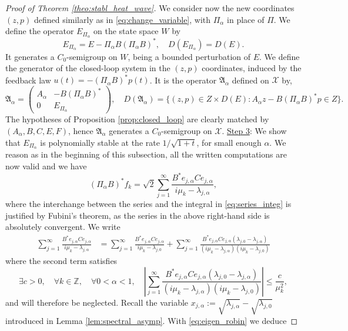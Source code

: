 \documentclass[10pt]{article}
\begin{document}
\begin{proof}[Proof of Theorem \ref{theo:stabl_heat_wave}]
We consider now the new coordinates $(z,p)$ defined similarly as in \eqref{eq:change_variable}, with $\Pi_\alpha$ in place of $\Pi$. We define the operator $E_{\Pi_\alpha}$ on the state space $W$ by 
\[
E_{\Pi_\alpha} = E - \Pi_\alpha B (\Pi_\alpha B)^*,\quad D(E_{\Pi_\alpha}) = D(E).
\]
It generates a $C_0$-semigroup on $W$, being a bounded perturbation of $E$. We define the generator of the closed-loop system in the $(z,p)$ coordinates, induced by the feedback law $u(t) = -(\Pi_\alpha B)^* p(t)$. It is the operator $\mathfrak{A}_\alpha$ defined on $\mathcal{X}$ by, 
\[
\mathfrak{A}_\alpha = \left( \begin{array}{cc}
A_\alpha & -B(\Pi_\alpha B)^* \\
0 & E_{\Pi_\alpha}
\end{array} \right),\quad 
D(\mathfrak{A}_\alpha) = \{ (z,p) \in Z \times D(E) : A_\alpha z - B(\Pi_\alpha B)^*p \in Z\}. 
\]
The hypotheses of Proposition \ref{prop:closed_loop} are clearly matched by $(A_\alpha, B, C, E, F)$, hence $\mathfrak{A}_\alpha$ generates a $C_0$-semigroup on $\mathcal{X}$. 
\newline
\newline
\underline{Step 3}: We show that $E_{\Pi_\alpha}$ is polynomially stable at the rate $1/\sqrt{1+t}$, for small enough $\alpha$.
\newline
\newline
We reason as in the beginning of this subsection, all the written computations are now valid and we have 
 \[
(\Pi_\alpha B)^* f_k = \sqrt{2} \sum_{j=1}^\infty \frac{B^* e_{j,\alpha} C e_{j,\alpha}}{i \mu_k - \lambda_{j,\alpha}},
\]
where the interchange between the series and the integral in \eqref{eq:series_integ} is justified by Fubini's theorem, as the series in the above right-hand side is absolutely convergent. We write
\begin{align*}
\sum_{j=1}^\infty \frac{B^* e_{j,\alpha} C e_{j,\alpha}}{i \mu_k - \lambda_{j,\alpha}} &= \sum_{j=1}^\infty \frac{B^* e_{j,\alpha} C e_{j,\alpha}}{i \mu_k - \lambda_{j,0}} + \sum_{j=1}^\infty \frac{B^* e_{j,\alpha} C e_{j,\alpha} (\lambda_{j,0} - \lambda_{j,\alpha})}{(i \mu_k - \lambda_{j,\alpha})(i \mu_k - \lambda_{j,0})}
\end{align*} 
where the second term satisfies 
\[
\exists c > 0,\quad \forall k \in \mathbb{Z},\quad \forall 0 < \alpha <1,\quad 
\left| \sum_{j=1}^\infty \frac{B^* e_{j,\alpha} C e_{j,\alpha} (\lambda_{j,0} - \lambda_{j,\alpha})}{(i \mu_k - \lambda_{j,\alpha})(i \mu_k - \lambda_{j,0})} \right| \leq \frac{c}{\mu_k^2},
\]
and will therefore be neglected. Recall the variable $x_{j,\alpha} := \sqrt{\lambda_{j,\alpha}} - \sqrt{\lambda_{j,0}}$ introduced in Lemma \ref{lem:spectral_asymp}. With \eqref{eq:eigen_robin} we deduce

\end{proof}
\end{document}

